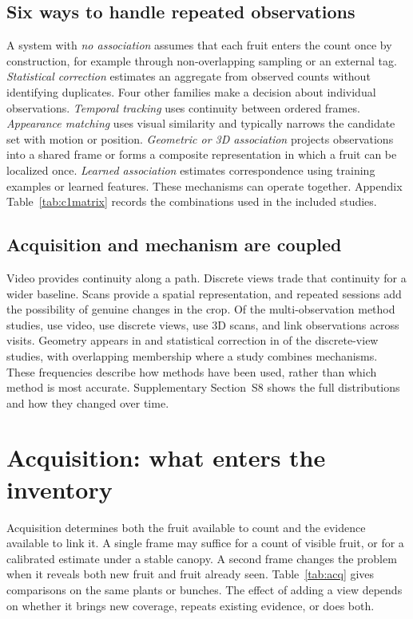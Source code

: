 \subsection{Six ways to handle repeated observations}\label{sec:mechdefs}
A system with \textit{no association} assumes that each fruit enters the count once by construction, for example through non-overlapping sampling or an external tag. \textit{Statistical correction} estimates an aggregate from observed counts without identifying duplicates. Four other families make a decision about individual observations. \textit{Temporal tracking} uses continuity between ordered frames. \textit{Appearance matching} uses visual similarity and typically narrows the candidate set with motion or position. \textit{Geometric or 3D association} projects observations into a shared frame or forms a composite representation in which a fruit can be localized once. \textit{Learned association} estimates correspondence using training examples or learned features. These mechanisms can operate together. Appendix Table~\ref{tab:c1matrix} records the combinations used in the included studies.

\subsection{Acquisition and mechanism are coupled}\label{sec:landscape}
Video provides continuity along a path. Discrete views trade that continuity for a wider baseline. Scans provide a spatial representation, and repeated sessions add the possibility of genuine changes in the crop. Of the \nMethod multi-observation method studies, \nVideo use video, \nDiscrete use discrete views, \nScan use 3D scans, and \nRevisit link observations across visits. Geometry appears in \nDiscreteGeom and statistical correction in \nDiscreteStat of the discrete-view studies, with overlapping membership where a study combines mechanisms. These frequencies describe how methods have been used, rather than which method is most accurate. Supplementary Section~S8 shows the full distributions and how they changed over time.

\section{Acquisition: what enters the inventory}\label{sec:acq}

Acquisition determines both the fruit available to count and the evidence available to link it. A single frame may suffice for a count of visible fruit, or for a calibrated estimate under a stable canopy. A second frame changes the problem when it reveals both new fruit and fruit already seen. Table~\ref{tab:acq} gives comparisons on the same plants or bunches. The effect of adding a view depends on whether it brings new coverage, repeats existing evidence, or does both.

